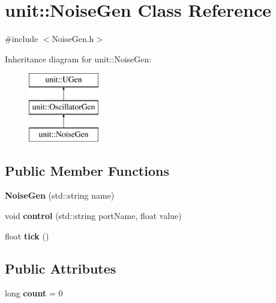 \hypertarget{classunit_1_1NoiseGen}{}\section{unit\+:\+:Noise\+Gen Class Reference}
\label{classunit_1_1NoiseGen}


{\ttfamily \#include $<$Noise\+Gen.\+h$>$}

Inheritance diagram for unit\+:\+:Noise\+Gen\+:\begin{figure}[H]
\begin{center}
\leavevmode
\includegraphics[height=3.000000cm]{classunit_1_1NoiseGen}
\end{center}
\end{figure}
\subsection*{Public Member Functions}
\begin{DoxyCompactItemize}
\item 
{\bfseries Noise\+Gen} (std\+::string name)\hypertarget{classunit_1_1NoiseGen_aa49d8817fff2757abc19f0dffea0c7fe}{}\label{classunit_1_1NoiseGen_aa49d8817fff2757abc19f0dffea0c7fe}

\item 
void {\bfseries control} (std\+::string port\+Name, float value)\hypertarget{classunit_1_1NoiseGen_a73628ae13d893658b88bc30eb43437ba}{}\label{classunit_1_1NoiseGen_a73628ae13d893658b88bc30eb43437ba}

\item 
float {\bfseries tick} ()\hypertarget{classunit_1_1NoiseGen_addaecf96df1cf9f1ba4875fb849949df}{}\label{classunit_1_1NoiseGen_addaecf96df1cf9f1ba4875fb849949df}

\end{DoxyCompactItemize}
\subsection*{Public Attributes}
\begin{DoxyCompactItemize}
\item 
long {\bfseries count} = 0\hypertarget{classunit_1_1NoiseGen_a9509da6dba8e294d3e5bc26d2eb6d39f}{}\label{classunit_1_1NoiseGen_a9509da6dba8e294d3e5bc26d2eb6d39f}

\end{DoxyCompactItemize}
